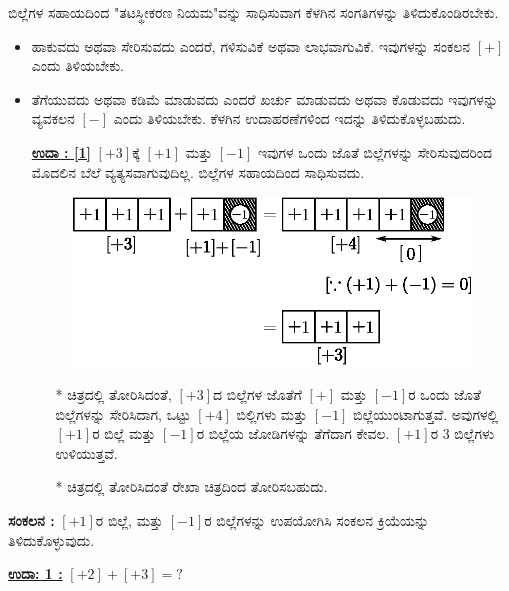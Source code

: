 ಬಿಲ್ಲೆಗಳ ಸಹಾಯದಿಂದ "ತಟಸ್ಥೀಕರಣ ನಿಯಮ"ವನ್ನು ಸಾಧಿಸುವಾಗ ಕೆಳಗಿನ ಸಂಗತಿಗಳನ್ನು ತಿಳಿದುಕೊಂಡಿರಬೇಕು.
\begin{itemize}
\item ಹಾಕುವದು ಅಥವಾ ಸೇರಿಸುವದು ಎಂದರೆ, ಗಳಿಸುವಿಕೆ ಅಥವಾ ಲಾಭವಾಗುವಿಕೆ. ಇವುಗಳನ್ನು ಸಂಕಲನ $[+]$ ಎಂದು ತಿಳಿಯಬೇಕು. 

\item ತೆಗೆಯುವದು ಅಥವಾ ಕಡಿಮೆ ಮಾಡುವದು ಎಂದರೆ ಖರ್ಚು ಮಾಡುವದು ಅಥವಾ ಕೊಡುವದು ಇವುಗಳನ್ನು ವ್ಯವಕಲನ $[-]$ ಎಂದು ತಿಳಿಯಬೇಕು. ಕೆಳಗಿನ ಉದಾಹರಣೆಗಳಿಂದ ಇದನ್ನು ತಿಳಿದುಕೊಳ್ಳಬಹುದು.

\noindent
\textbf{\underline{ಉದಾ : [1]}} $[+3]$ಕ್ಕೆ $[+1]$ ಮತ್ತು $[-1]$ ಇವುಗಳ ಒಂದು ಜೊತೆ ಬಿಲ್ಲೆಗಳನ್ನು ಸೇರಿಸುವುದರಿಂದ ಮೊದಲಿನ ಬೆಲೆ ವ್ಯತ್ಯಸವಾಗುವುದಿಲ್ಲ. ಬಿಲ್ಲೆಗಳ ಸಹಾಯದಿಂದ ಸಾಧಿಸುವದು. 
\begin{figure}[H]
\centering
\includegraphics[scale=0.8]{src/figure/chap3/fig3-7b.eps}
\end{figure}

\begin{itemize}
\item[*] ಚಿತ್ರದಲ್ಲಿ ತೋರಿಸಿದಂತೆ, $[+3]$ದ ಬಿಲ್ಲೆಗಳ ಜೊತೆಗೆ $[+]$ ಮತ್ತು $[-1]$ರ ಒಂದು ಜೊತೆ ಬಿಲ್ಲೆಗಳನ್ನು ಸೇರಿಸಿದಾಗ, ಒಟ್ಟು $[+4]$ ಬಿಲ್ಲಿಗಳು ಮತ್ತು $[-1]$ ಬಿಲ್ಲೆಯುಂಟಾಗುತ್ತವೆ. ಅವುಗಳಲ್ಲಿ $[+1]$ರ ಬಿಲ್ಲೆ ಮತ್ತು $[-1]$ರ ಬಿಲ್ಲೆಯ ಜೋಡಿಗಳನ್ನು ತೆಗೆದಾಗ ಕೇವಲ. $[+ 1]$ರ 3 ಬಿಲ್ಲೆಗಳು ಉಳಿಯುತ್ತವೆ.

\item[*] ಚಿತ್ರದಲ್ಲಿ ತೋರಿಸಿದಂತೆ ರೇಖಾ ಚಿತ್ರದಿಂದ ತೋರಿಸಬಹುದು.
\end{itemize}
\end{itemize}

\noindent
\medskip
\textbf{ಸಂಕಲನ :} $[+1]$ರ  ಬಿಲ್ಲೆ, ಮತ್ತು $[-1]$ರ  ಬಿಲ್ಲೆಗಳನ್ನು ಉಪಯೋಗಿಸಿ ಸಂಕಲನ ಕ್ರಿಯೆ\break ಯನ್ನು ತಿಳಿದುಕೊಳ್ಳುವುದು.

\noindent
{\textbf{\underline{ಉದಾ: 1 :}}} $[+2] + [+3] = ?$

